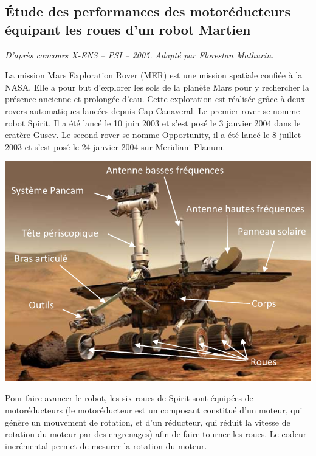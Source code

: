 \documentclass[10pt,fleqn]{article} %
\begin{document}

\vspace{6cm}
\pagestyle{fancy}
\thispagestyle{plain}

\def\columnseprulecolor{\color{ocre}}
\setlength{\columnseprule}{0.4pt} 


\begin{multicols}{2}

\section*{Étude des performances des motoréducteurs équipant les roues d’un robot Martien}
\begin{flushright}
\textit{D'après concours X-ENS -- PSI -- 2005.}
\textit{Adapté par Florestan Mathurin.}
\end{flushright}
\ifprof
\else
La mission Mars Exploration Rover (MER) est une mission spatiale confiée à la NASA. Elle a pour but d’explorer les sols de la planète Mars pour y rechercher la présence ancienne et prolongée d’eau.  Cette exploration est réalisée grâce à deux rovers automatiques lancées depuis Cap Canaveral. Le premier rover se nomme robot Spirit. Il a été lancé le 10 juin 2003 et s’est posé le 3 janvier 2004 dans le cratère Gusev. Le second rover se nomme Opportunity, il a été lancé le 8 juillet 2003 et s’est posé le 24 janvier 2004 sur Meridiani Planum. 
 
\begin{center}
\includegraphics[width=.9\linewidth]{images/fig_01}
\end{center}



Pour faire avancer le robot, les six roues de Spirit sont équipées de motoréducteurs (le motoréducteur est un composant constitué d'un moteur, qui génère un mouvement de rotation, et d'un réducteur, qui réduit la vitesse de rotation du moteur par des engrenages) afin de faire tourner les roues. Le codeur incrémental permet de mesurer la rotation du moteur. 


\end{multicols}
\end{document}
